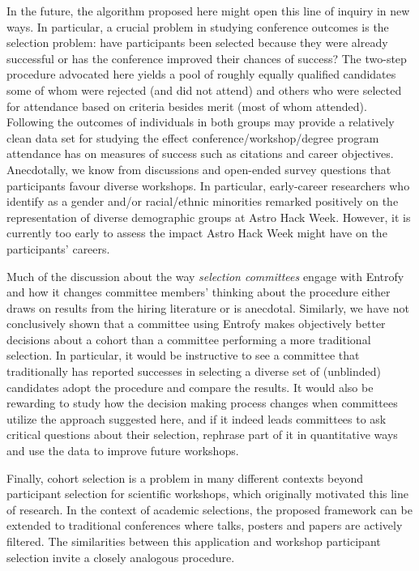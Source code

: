 \documentclass[10pt,letterpaper]{article}
\begin{document}
In the future, the algorithm proposed here might open this line of inquiry in new ways.
In particular, a crucial problem in studying conference outcomes is the selection problem: have participants been selected because they were already successful or has the conference improved their chances of success?
The two-step procedure advocated here yields a pool of roughly equally qualified candidates some of whom were rejected (and did not attend) and others who were selected for attendance based on criteria besides merit (most of whom attended).
Following the outcomes of individuals in both groups may provide a relatively clean data set for studying the effect conference/workshop/degree program attendance has on measures of success such as citations and career objectives. 
Anecdotally, we know from discussions and open-ended survey questions that participants favour diverse workshops.
In particular, early-career researchers who identify as a gender and/or racial/ethnic minorities remarked positively on the representation of diverse demographic groups at Astro Hack Week.
However, it is currently too early to assess the impact Astro Hack Week might have on the participants' careers. 

Much of the discussion about the way \textit{selection committees} engage with Entrofy and how it changes committee members' thinking about the procedure  either draws on results from the hiring literature or is anecdotal.
Similarly, we have not conclusively shown that a committee using Entrofy makes objectively better decisions about a cohort than a committee performing a more traditional selection.  
In particular, it would be instructive to see a committee that traditionally has reported successes in selecting a diverse set of (unblinded) candidates adopt the procedure and compare the results.
It would also be rewarding to study how the decision making process changes when committees utilize the approach suggested here, and if it indeed leads committees to ask critical questions about their selection, rephrase part of it in quantitative ways and use the data to improve future workshops.

Finally, cohort selection is a problem in many different contexts beyond participant selection for scientific workshops, which originally motivated this line of research.
In the context of academic selections, the proposed framework can be extended to traditional conferences where talks, posters and papers are actively filtered.
The similarities between this application and workshop participant selection invite a closely analogous procedure.
\end{document}
